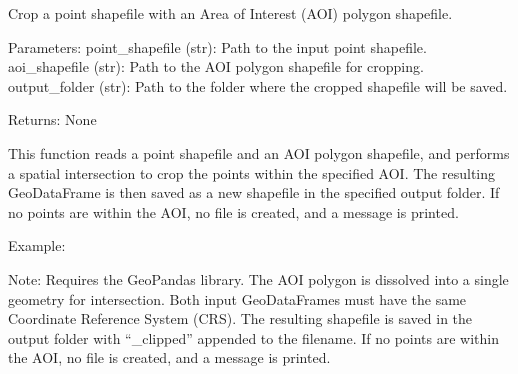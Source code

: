 \documentclass[letterpaper,10pt,english]{sphinxmanual}
\begin{document}
\begin{fulllineitems}
\label{\detokenize{akhdefo_functions:akhdefo_functions.Akhdefo_utils.crop_point_shapefile_with_aoi}}
\pysigstartsignatures
{}
\pysigstopsignatures
\sphinxAtStartPar
Crop a point shapefile with an Area of Interest (AOI) polygon shapefile.

\sphinxAtStartPar
Parameters:
\sphinxhyphen{} point\_shapefile (str): Path to the input point shapefile.
\sphinxhyphen{} aoi\_shapefile (str): Path to the AOI polygon shapefile for cropping.
\sphinxhyphen{} output\_folder (str): Path to the folder where the cropped shapefile will be saved.

\sphinxAtStartPar
Returns:
None

\sphinxAtStartPar
This function reads a point shapefile and an AOI polygon shapefile, and performs a spatial
intersection to crop the points within the specified AOI. The resulting GeoDataFrame is then
saved as a new shapefile in the specified output folder. If no points are within the AOI, no
file is created, and a message is printed.

\sphinxAtStartPar
Example:

\sphinxAtStartPar
{}

\sphinxAtStartPar
Note:
\sphinxhyphen{} Requires the GeoPandas library.
\sphinxhyphen{} The AOI polygon is dissolved into a single geometry for intersection.
\sphinxhyphen{} Both input GeoDataFrames must have the same Coordinate Reference System (CRS).
\sphinxhyphen{} The resulting shapefile is saved in the output folder with “\_clipped” appended to the filename.
\sphinxhyphen{} If no points are within the AOI, no file is created, and a message is printed.

\end{fulllineitems}
\end{document}
